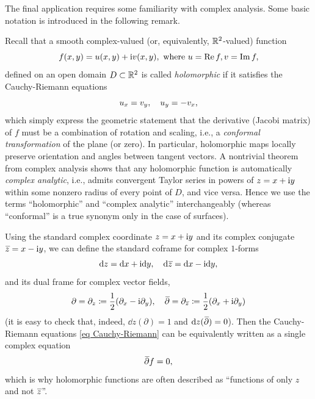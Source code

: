 The final application requires some familiarity with complex analysis. Some basic notation is introduced in the following remark.
\begin{rem}\label{rem holomorphic functions}
    Recall that a smooth complex-valued (or, equivalently, $\mathbb{R}^2$-valued) function 
    \[f(x,y)=u(x,y)+\mathrm{i} v(x,y),\text{ where } u=\operatorname{Re} f,v=\operatorname{Im} f,\]
    defined on an open domain $D\subset\mathbb{R}^2$ is called \emph{holomorphic} if it satisfies the Cauchy-Riemann equations 
    \[u_x=v_y, \quad u_y=-v_x,\label{eq Cauchy-Riemann}\index{Equation!Cauchy-Riemann}\]
    which simply express the geometric statement that the derivative (Jacobi matrix) of $f$ must be a combination of rotation and scaling, i.e., a \emph{conformal transformation} of the plane (or zero). In particular, holomorphic maps locally preserve orientation and angles between tangent vectors. A nontrivial theorem from complex analysis shows that any holomorphic function is automatically \emph{complex analytic}, i.e., admits convergent Taylor series in powers of $z=x+\mathrm{i} y$ within some nonzero radius of every point of $D$, and vice versa. Hence we use the terms ``holomorphic'' and ``complex analytic'' interchangeably (whereas ``conformal'' is a true synonym only in the case of surfaces).

    Using the standard complex coordinate $z=x+\mathrm{i} y$ and its complex conjugate $\wb{z}=x-\i y$, we can define the standard coframe for complex $1$-forms
    \[\dd z=\dd x+\i \dd y,\quad \dd \wb{z}=\dd x-\i \dd y,\]
    and its dual frame for complex vector fields,
    \[\partial= \partial_z\coloneqq\frac{1}{2}(\partial_x-\i \partial_y),\quad \wb\partial= \partial_{\wb{z}}\coloneqq\frac{1}{2}(\partial_x+\i \partial_y)\]
    (it is easy to check that, indeed, $\dd z(\partial)=1$ and $\dd z(\wb\partial)=0$). Then the Cauchy-Riemann equations \eqref{eq Cauchy-Riemann} can be equivalently written as a single complex equation
    \[\wb\partial f=0,\]
    which is why holomorphic functions are often described as ``functions of only $z$ and not $\wb{z}$''.


\end{rem}
